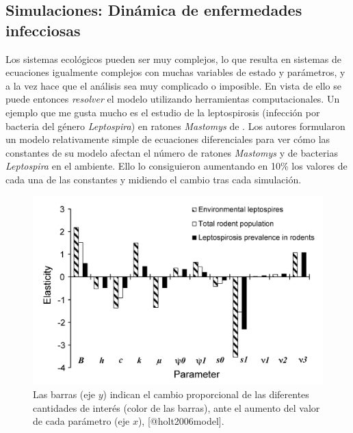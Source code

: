 \documentclass[
]{book}
\begin{document}
\hypertarget{simulaciones-dinuxe1mica-de-enfermedades-infecciosas}{%
\subsection{Simulaciones: Dinámica de enfermedades infecciosas}\label{simulaciones-dinuxe1mica-de-enfermedades-infecciosas}}

Los sistemas ecológicos pueden ser muy complejos, lo que resulta en sistemas de ecuaciones igualmente complejos con muchas variables de estado y parámetros, y a la vez hace que el análisis sea muy complicado o imposible. En vista de ello se puede entonces \emph{resolver} el modelo utilizando herramientas computacionales. Un ejemplo que me gusta mucho es el estudio de la leptospirosis (infección por bacteria del género \emph{Leptospira}) en ratones \emph{Mastomys} de \citet{holt2006model}. Los autores formularon un modelo relativamente simple de ecuaciones diferenciales para ver cómo las constantes de su modelo afectan el número de ratones \emph{Mastomys} y de bacterias \emph{Leptospira} en el ambiente. Ello lo consiguieron aumentando en 10\% los valores de cada una de las constantes y midiendo el cambio tras cada simulación.

\begin{figure}

{\centering \includegraphics[width=22.76in]{Unidad-I/lepto} 

}

\caption{Las barras (eje $y$) indican el cambio proporcional de las diferentes cantidades de interés (color de las barras), ante el aumento del valor de cada parámetro (eje $x$), [@holt2006model].}\label{fig:lepto}
\end{figure}
\end{document}
